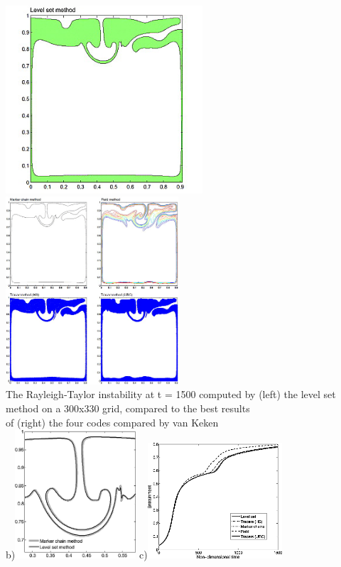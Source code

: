 \begin{itemize}
\begin{center}
\includegraphics[height=7cm]{images/benchmark_vaks97/sunh10_a}
\includegraphics[height=7cm]{images/benchmark_vaks97/sunh10_e}\\
{\captionfont The Rayleigh‐Taylor instability at t = 1500 computed by (left) 
the level set method on a 300x330 grid, compared to the best results\\ 
of (right) the four codes compared by van Keken \etal }\\
b)\includegraphics[width=4.5cm]{images/benchmark_vaks97/sunh10_b}
c)\includegraphics[width=5cm]{images/benchmark_vaks97/sunh10_c}

\end{center}
\end{itemize}
